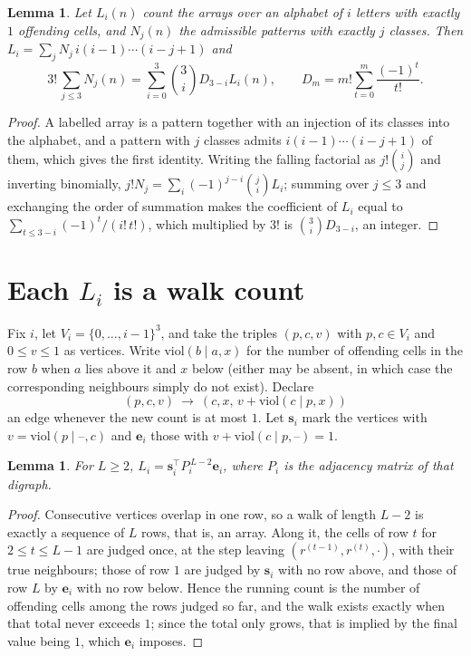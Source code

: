 \documentclass[11pt,a4paper]{article}
\theoremstyle{plain}
\newtheorem{lemma}[theorem]{Lemma}
\theoremstyle{definition}
\begin{document}
\begin{lemma}\label{lem:inv}
Let $L_i(n)$ count the arrays over an alphabet of $i$ letters with exactly $1$ offending
cells, and $N_j(n)$ the admissible patterns with exactly $j$ classes. Then
$L_i=\sum_j N_j\,i(i-1)\cdots(i-j+1)$ and
\[
3!\,\sum_{j\le3}N_j(n)=\sum_{i=0}^{3}\binom{3}{i}D_{3-i}L_i(n),
\qquad D_m=m!\sum_{t=0}^{m}\frac{(-1)^t}{t!} .
\]
\end{lemma}

\begin{proof}
A labelled array is a pattern together with an injection of its classes into the alphabet,
and a pattern with $j$ classes admits $i(i-1)\cdots(i-j+1)$ of them, which gives the first
identity. Writing the falling factorial as $j!\binom{i}{j}$ and inverting binomially,
$j!N_j=\sum_i(-1)^{j-i}\binom{j}{i}L_i$; summing over $j\le3$ and exchanging the
order of summation makes the coefficient of $L_i$ equal to
$\sum_{t\le3-i}(-1)^t/(i!\,t!)$, which multiplied by $3!$ is
$\binom{3}{i}D_{3-i}$, an integer.
\end{proof}

\section{Each $L_i$ is a walk count}

Fix $i$, let $V_i=\{0,\dots,i-1\}^{3}$, and take the triples $(p,c,v)$ with
$p,c\in V_i$ and $0\le v\le1$ as vertices. Write $\mathrm{viol}(b\mid a,x)$ for the number
of offending cells in the row $b$ when $a$ lies above it and $x$ below (either may be
absent, in which case the corresponding neighbours simply do not exist). Declare
\[
(p,c,v)\ \longrightarrow\ (c,x,\,v+\mathrm{viol}(c\mid p,x))
\]
an edge whenever the new count is at most $1$. Let $\mathbf{s}_i$ mark the vertices with
$v=\mathrm{viol}(p\mid\text{--},c)$ and $\mathbf{e}_i$ those with
$v+\mathrm{viol}(c\mid p,\text{--})=1$.

\begin{lemma}\label{lem:walk}
For $L\ge2$, $L_i=\mathbf{s}_i^{\!\top}P_i^{\,L-2}\mathbf{e}_i$, where $P_i$ is the
adjacency matrix of that digraph.
\end{lemma}

\begin{proof}
Consecutive vertices overlap in one row, so a walk of length $L-2$ is exactly a sequence
of $L$ rows, that is, an array. Along it, the cells of row $t$ for $2\le t\le L-1$ are
judged once, at the step leaving $(r^{(t-1)},r^{(t)},\cdot)$, with their true neighbours;
those of row $1$ are judged by $\mathbf{s}_i$ with no row above, and those of row
$L$ by $\mathbf{e}_i$ with no row below. Hence the running count is the number of
offending cells among the rows judged so far, and the walk exists exactly when that total
never exceeds $1$; since the total only grows, that is implied by the final value being
$1$, which $\mathbf{e}_i$ imposes.
\end{proof}
\end{document}
